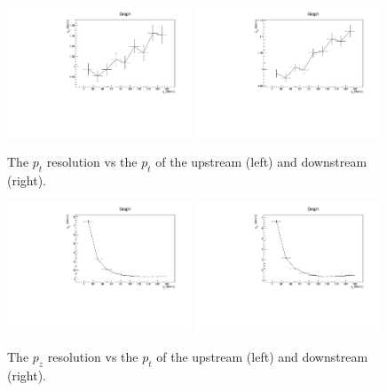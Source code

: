   \begin{figure}[p]
   \begin{center}
     \includegraphics[width=0.49\textwidth, angle=0]{08-Performance/upstream_pt_resolution_vs_pt.pdf}
     \includegraphics[width=0.49\textwidth, angle=0]{08-Performance/downstream_pt_resolution_vs_pt.pdf}
     \caption{\label{fig:PtPtResolKalman} The $p_t$ resolution vs the $p_t$ of the upstream (left) and downstream (right).}
   \end{center}
  \end{figure}
  
  \begin{figure}[p]
   \begin{center}
     \includegraphics[width=0.49\textwidth, angle=0]{08-Performance/upstream_pz_resolution_vs_pt.pdf}
     \includegraphics[width=0.49\textwidth, angle=0]{08-Performance/downstream_pz_resolution_vs_pt.pdf}
     \caption{\label{fig:PtPzResolKalman} The $p_z$ resolution vs the $p_t$ of the upstream (left) and downstream (right).}
   \end{center}
  \end{figure}

